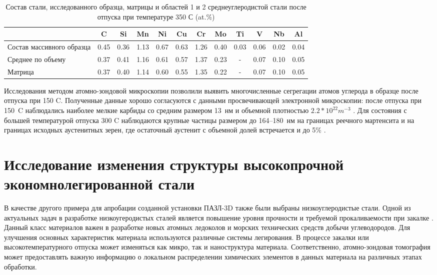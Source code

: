 \begin{table} [htbp]
	\centering
	\caption{Состав стали, исследованного образца, матрицы и областей 1 и 2 среднеуглеродистой стали после отпуска при температуре 350 \textdegree С (at.\%)}%
	\label{tab:SteelComposition350}%
	\begin{SingleSpace}
		\begin{tabular}{|p{3cm}| c | c | c | c | c | c | c | c | c | c | c |}
			\hline
			& C & Si & Mn & Ni & Cu & Cr & Mo & Ti & V & Nb & Al     \\ \hline
			Состав массивного образца     & 0.45 & 0.36 & 1.13 & 0.67 & 0.63 & 1.26 & 0.40 & 0.03 & 0.06 & 0.02 & 0.04   \\ \hline
			Среднее по объему   & 0.37 & 0.41 & 1.16 & 0.61 & 0.57 & 1.37 & 0.23 & - & 0.07 & 0.10 & 0.05   \\  \hline		
			Матрица   & 0.37 & 0.40 & 1.14 & 0.60 & 0.55 & 1.35 & 0.22 & - & 0.07 & 0.10 & 0.05   \\  \hline		
		\end{tabular}%
	\end{SingleSpace}
\end{table}
\FloatBarrier
Исследования методом атомно-зондовой микроскопии позволили выявить многочисленные сегрегации атомов углерода в образце после отпуска при 150 \textdegree C. Полученные данные хорошо согласуются с данными просвечивающей электронной микроскопии: после отпуска при 150~\textdegree C наблюдались наиболее мелкие карбиды со средним размером 13~нм и объемной плотностью $2.2*10^{22} m^{-3}$ \cite{scbibRyabov}. Для состояния  с большей температурой отпуска 300 \textdegree C наблюдаются крупные частицы размером до 164–180~нм на границах реечного мартенсита и на границах исходных аустенитных зерен, где остаточный аустенит с объемной долей встречается и до 5\% \cite{scbibRyabov}.

\FloatBarrier

\section{Исследование изменения структуры высокопрочной экономнолегированной стали}\label{sec:ch4/sect3}

В качестве другого примера для апробации созданной установки ПАЗЛ-3D также были выбраны низкоуглеродистые стали. Одной из актуальных задач в разработке низкоугеродистых сталей является повышение уровня прочности и требуемой прокаливаемости при закалке \cite{scbibGlubev}. Данный класс материалов важен в разработке новых атомных ледоколов и морских технических средств добычи углеводородов. Для улучшения основных характеристик материала используются различные системы легирования. В процессе закалки или высокотемпературного отпуска может изменяться как микро, так и наноструктура материала. Соответственно, атомно-зондовая томография может предоставлять важную информацию о локальном распределении химических элементов в данных материала на различных этапах обработки.


